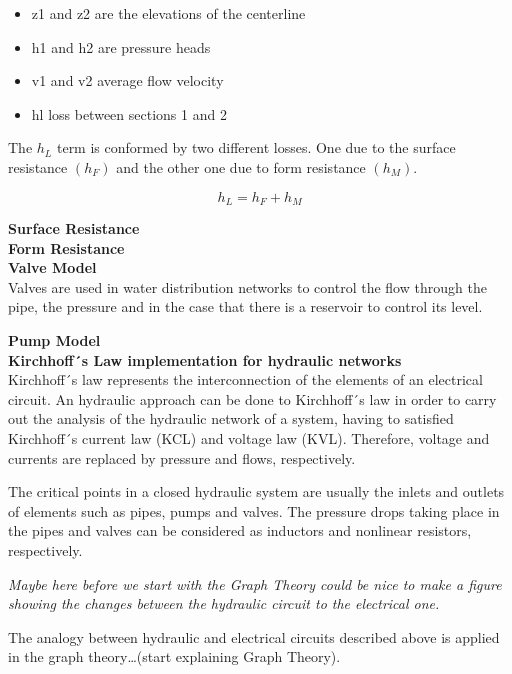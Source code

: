 \begin{itemize}
  \item   z1 and z2 are the elevations of the centerline
  \item   h1 and h2 are pressure heads
  \item   v1 and v2 average flow velocity
  \item   hl loss between sections 1 and 2
\end{itemize}

The $h_L$ term is conformed by two different losses. One due to the surface resistance $(h_F)$ and the other one due to form resistance $(h_M)$. 

\begin{equation}
  h_L = h_F + h_M
\end{equation}

\textbf{Surface Resistance} \\ 

\textbf{Form Resistance} \\ 

\textbf{Valve Model}  \\
 Valves are used in water distribution networks to control the flow through the pipe, the pressure and in 
 the case that there is a reservoir to control its level. 
 
 \textbf{Pump Model} \\
 
 \textbf{Kirchhoff´s Law implementation for hydraulic networks}\\
 Kirchhoff´s law represents the interconnection of the elements of an electrical circuit. An hydraulic approach 
 can be done to Kirchhoff´s law in order to carry out the analysis of the hydraulic network of a system, having to satisfied Kirchhoff´s 
 current law (KCL) and voltage law (KVL). Therefore, voltage and currents are replaced by pressure and flows, respectively. 

The critical points in a closed hydraulic system are usually the inlets and outlets of elements such as pipes, pumps and valves. 
The pressure drops taking place in the pipes and valves can be considered as inductors and nonlinear resistors, respectively. 

\textit{Maybe here before we start with the Graph Theory could be nice to make a figure showing the changes between the hydraulic circuit to the electrical 
one.}

The analogy between hydraulic and electrical circuits described above is applied in the graph theory…(start explaining Graph Theory).









